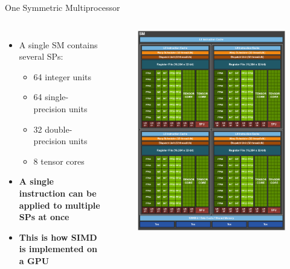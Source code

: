 \documentclass{beamer}
\begin{document}
    \begin{frame}{One Symmetric Multiprocessor}
        \begin{columns}
            \begin{itemize}
                \item A single SM contains several SPs:
                \begin{itemize}
                    \item 64 integer units
                    \item 64 single-precision units
                    \item 32 double-precision units
                    \item 8 tensor cores
                \end{itemize}
                \item \textbf{A single instruction can be applied to multiple SPs at once}
                \item \textbf{This is how SIMD is implemented on a GPU}
            \end{itemize}
            \begin{figure}
                \centering
                \includegraphics[width=\textwidth]{img/03/volta-sps.png}
            \end{figure}
        \end{columns}
    \end{frame}
\end{document}
